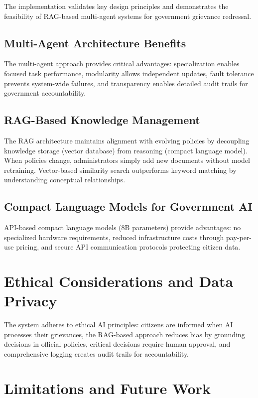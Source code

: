 \documentclass[conference]{IEEEtran}
\begin{document}
The implementation validates key design principles and demonstrates the feasibility of RAG-based multi-agent systems for government grievance redressal.

\subsection{Multi-Agent Architecture Benefits}

The multi-agent approach provides critical advantages: specialization enables focused task performance, modularity allows independent updates, fault tolerance prevents system-wide failures, and transparency enables detailed audit trails for government accountability.

\subsection{RAG-Based Knowledge Management}

The RAG architecture maintains alignment with evolving policies by decoupling knowledge storage (vector database) from reasoning (compact language model). When policies change, administrators simply add new documents without model retraining. Vector-based similarity search outperforms keyword matching by understanding conceptual relationships.

\subsection{Compact Language Models for Government AI}

API-based compact language models (8B parameters) provide advantages: no specialized hardware requirements, reduced infrastructure costs through pay-per-use pricing, and secure API communication protocols protecting citizen data.

\section{Ethical Considerations and Data Privacy}

The system adheres to ethical AI principles: citizens are informed when AI processes their grievances, the RAG-based approach reduces bias by grounding decisions in official policies, critical decisions require human approval, and comprehensive logging creates audit trails for accountability.

\section{Limitations and Future Work}
\end{document}
